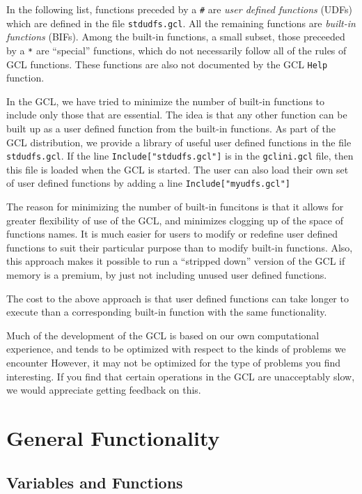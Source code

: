 In the following list, functions preceded by a \verb+#+ are {\it user
defined functions} (UDFs) which are defined in the file
\verb+stdudfs.gcl+.  All the remaining functions are {\it built-in
functions} (BIFs).  Among the built-in functions, a small subset,
those preceeded by a \verb+*+ are ``special'' functions, which do not
necessarily follow all of the rules of GCL functions.  These functions
are also not documented by the GCL \verb+Help+ function.  

In the GCL, we have tried to minimize the number of built-in functions
to include only those that are essential.  The idea is that any other
function can be built up as a user defined function from the built-in
functions.  As part of the GCL distribution, we provide a library of
useful user defined functions in the file \verb+stdudfs.gcl+.  If the
line \verb+Include["stdudfs.gcl"]+ is in the \verb+gclini.gcl+ file,
then this file is loaded when the GCL is started.  The user can also
load their own set of user defined functions by adding a line
\verb+Include["myudfs.gcl"]+

The reason for minimizing the number of built-in funcitons is that it
allows for greater flexibility of use of the GCL, and minimizes
clogging up of the space of functions names.  It is much easier for
users to modify or redefine user defined functions to suit their
particular purpose than to modify built-in functions.  Also, this
approach makes it possible to run a ``stripped down'' version of the
GCL if memory is a premium, by just not including unused user defined
functions.

The cost to the above approach is that user defined functions can take
longer to execute than a corresponding built-in function with the same
functionality.

Much of the development of the GCL is based on our own computational
experience, and tends to be optimized with respect to the kinds of
problems we encounter  However, it may not be optimized
for the type of problems you find interesting.  If you find that
certain operations in the GCL are unacceptably slow, we would
appreciate getting feedback on this.

\section{General Functionality}

\subsection{Variables and Functions}


